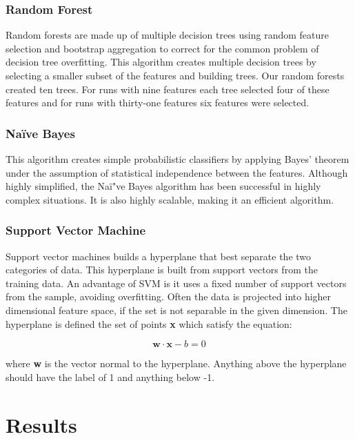 \documentclass[aps, reprint, amsmath, amssymb]{revtex4-1}
\begin{document}
\subsubsection{Random Forest}
Random forests are made up of multiple decision trees using random feature selection and bootstrap aggregation to correct for the common problem of decision tree overfitting.  This algorithm creates multiple decision trees by selecting a smaller subset of the features and building trees. Our random forests created ten trees.  For runs with nine features each tree selected four of these features and for runs with thirty-one features six features were selected.

\subsubsection{Na{\"i}ve Bayes}
This algorithm creates simple probabilistic classifiers by applying Bayes' theorem under the assumption of statistical independence between the features.  Although highly simplified, the Na{\"i"}ve Bayes algorithm has been successful in highly complex situations.  It is also highly scalable, making it an efficient algorithm.  

\subsubsection{Support Vector Machine}
Support vector machines builds a hyperplane that best separate the two categories of data. This hyperplane is built from support vectors from the training data.  An advantage of SVM is it uses a fixed number of support vectors from the sample, avoiding overfitting.  Often the data is projected into higher dimensional feature space, if the set is not separable in the given dimension.  The hyperplane is defined the set of points \textbf{x} which satisfy the equation:

\begin{equation}
\mathbf{w} \cdot \mathbf{x} - b = 0
\end{equation}

where \textbf{w} is the vector normal to the hyperplane.  Anything above the hyperplane should have the label of 1 and anything below -1.  

\section{Results}
\end{document}
